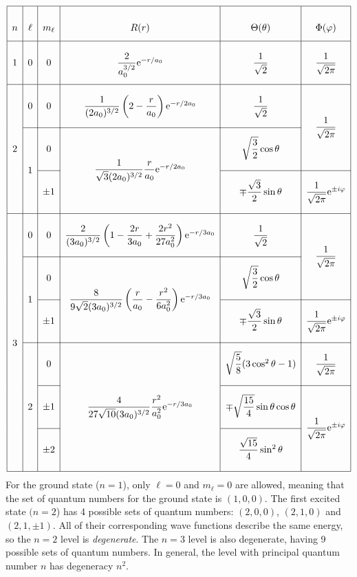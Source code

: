 \documentclass{subfiles}
\begin{document}
				\[\renewcommand{\arraystretch}{3}\begin{array}{|c|c|c|c|c|c|}\hline
					n & \ell & m_\ell & R(r) & \Theta(\theta) & \Phi(\varphi) \\\hline
					1 & 0 & 0 & \dfrac{2}{a_0^{3/2}}\en^{-r/a_0} & \dfrac{1}{\sqrt{2}} & \dfrac{1}{\sqrt{2\pi}} \\[2ex]\hline
					\multirow{3.75}*{2} & 0 & 0 & \dfrac{1}{(2a_0)^{3/2}}\left(2 - \dfrac{r}{a_0}\right)\en^{-r/2a_0} & \dfrac{1}{\sqrt{2}} & \multirow{2.5}*{\(\dfrac{1}{\sqrt{2\pi}}\)} \\[2ex]\cline{2-5}
					& \multirow{2.5}*{1} & 0 & \multirow{2.5}*{\(\dfrac{1}{\sqrt{3}(2a_0)^{3/2}}\dfrac{r}{a_0}\en^{-r/2a_0}\)} & \sqrt{\dfrac{3}{2}}\cos\theta & \\[2ex]\cline{3-3}\cline{5-6}
					& & \pm 1 & & \mp\dfrac{\sqrt{3}}{2}\sin\theta & \dfrac{1}{\sqrt{2\pi}}\en^{\pm i\varphi} \\[2ex]\hline
					\multirow{7.5}*{3} & 0 & 0 & \dfrac{2}{(3a_0)^{3/2}}\left(1 - \dfrac{2r}{3a_0} + \dfrac{2r^2}{27a_0^2}\right)\en^{-r/3a_0} & \dfrac{1}{\sqrt{2}} & \multirow{2.5}*{\(\dfrac{1}{\sqrt{2\pi}}\)} \\[2ex]\cline{2-5}
					& \multirow{2.5}*{1} & 0 & \multirow{2.5}*{\(\dfrac{8}{9\sqrt{2}(3a_0)^{3/2}}\left(\dfrac{r}{a_0} - \dfrac{r^2}{6a_0^2}\right)\en^{-r/3a_0}\)} & \sqrt{\dfrac{3}{2}}\cos\theta & \\[2ex]\cline{3-3}\cline{5-6}
					& & \pm 1 & & \mp\dfrac{\sqrt{3}}{2}\sin\theta & \dfrac{1}{\sqrt{2\pi}}\en^{\pm i\varphi} \\[2ex]\cline{2-6}
					& \multirow{3.75}*{2} & 0 & \multirow{3.75}*{\(\dfrac{4}{27\sqrt{10}(3a_0)^{3/2}}\dfrac{r^2}{a_0^2}\en^{-r/3a_0}\)} & \sqrt{\dfrac{5}{8}}(3\cos^2\theta - 1) & \dfrac{1}{\sqrt{2\pi}} \\[2ex]\cline{3-3}\cline{5-6}
					& & \pm 1 & & \mp\sqrt{\dfrac{15}{4}}\sin\theta\cos\theta & \multirow{2.5}*{\(\dfrac{1}{\sqrt{2\pi}}\en^{\pm i\varphi}\)} \\[2ex]\cline{3-3}\cline{5-5}
					& & \pm 2 & & \dfrac{\sqrt{15}}{4}\sin^2\theta & \\[2ex]\hline
				\end{array}\]
			For the ground state (\(n = 1\)), only \(\ell = 0\) and \(m_\ell = 0\) are allowed, meaning that the set of quantum numbers for the ground state is \((1, 0, 0)\). The first excited state \((n = 2\)) has 4 possible sets of quantum numbers: \((2, 0, 0)\), \((2, 1, 0)\) and \((2, 1, \pm 1)\). All of their corresponding wave functions describe the same energy, so the \(n = 2\) level is \textit{degenerate}. The \(n = 3\) level is also degenerate, having 9 possible sets of quantum numbers. In general, the level with principal quantum number \(n\) has degeneracy \(n^2\). \\
\end{document}
